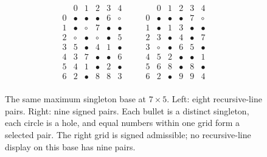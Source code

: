 \documentclass[11pt,a4paper]{article}
\theoremstyle{definition}
\begin{document}
\begin{figure}[ht]
\centering
\[
\begin{array}{c|ccccc}
 &0&1&2&3&4\\\hline
0&\bullet&\bullet&\bullet&6&\circ\\
1&\bullet&\circ&7&\bullet&\bullet\\
2&\circ&\bullet&\circ&\bullet&5\\
3&5&\bullet&4&1&\bullet\\
4&3&7&\bullet&\bullet&6\\
5&4&1&\bullet&2&\bullet\\
6&2&\bullet&8&8&3\\
\end{array}\qquad\begin{array}{c|ccccc}
 &0&1&2&3&4\\\hline
0&\bullet&\bullet&\bullet&7&\circ\\
1&\bullet&1&3&\bullet&\bullet\\
2&3&\bullet&4&\bullet&7\\
3&\circ&\bullet&6&5&\bullet\\
4&5&2&\bullet&\bullet&1\\
5&6&8&\bullet&8&\bullet\\
6&2&\bullet&9&9&4\\
\end{array}
\]
\caption{The same maximum singleton base at $7\times5$.
Left: eight recursive-line pairs. Right: nine signed pairs.
Each bullet is a distinct singleton, each circle is a hole, and equal
numbers within one grid form a selected pair. The right grid is signed
admissible; no recursive-line display on this base has nine pairs.}
\label{fig:fixed-base-gap}
\end{figure}
\appendix
\end{document}
